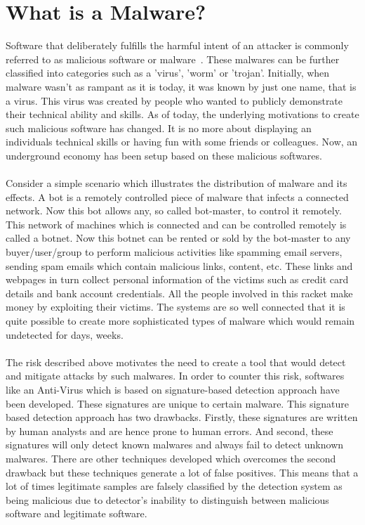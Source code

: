 \documentclass[11pt]{article}
\begin{document}
		\section{What is a Malware?}
	Software that deliberately fulfills the harmful intent of an attacker is commonly referred to as malicious software or malware~\cite{moser2007exploring}. These malwares can be further classified into categories such as a 'virus', 'worm' or 'trojan'. Initially, when malware wasn't as rampant as it is today, it was known by just one name, that is a virus. This virus was created by people who wanted to publicly demonstrate their technical ability and skills. As of today, the underlying motivations to create such malicious software has changed. It is no more about displaying an individuals technical skills or having fun with some friends or colleagues. Now, an underground economy has been setup based on these malicious softwares.\\ \\
	Consider a simple scenario which illustrates the distribution of malware and its effects. A bot is a remotely controlled piece of malware that infects a connected network. Now this bot allows any, so called bot-master, to control it remotely. This network of machines which is connected and can be controlled remotely is called a botnet. Now this botnet can be rented or sold by the bot-master to any buyer/user/group to perform malicious activities like spamming email servers, sending spam emails which contain malicious links, content, etc. These links and webpages in turn collect personal information of the victims such as credit card details and bank account credentials. All the people involved in this racket make money by exploiting their victims. The systems are so well connected that it is quite possible to create more sophisticated types of malware which would remain undetected for days, weeks.\\ \\
	The risk described above motivates the need to create a tool that would detect and mitigate attacks by such malwares. In order to counter this risk, softwares like an Anti-Virus which is based on signature-based detection approach have been developed. These signatures are unique to certain malware. This signature based detection approach has two drawbacks. Firstly, these signatures are written by human analysts and are hence prone to human errors. And second, these signatures will only detect known malwares and always fail to detect unknown malwares.
	There are other techniques developed which overcomes the second drawback but these techniques generate a lot of false positives. This means that a lot of times legitimate samples are falsely classified by the detection system as being malicious due to detector's inability to distinguish between malicious software and legitimate software.
\end{document}
